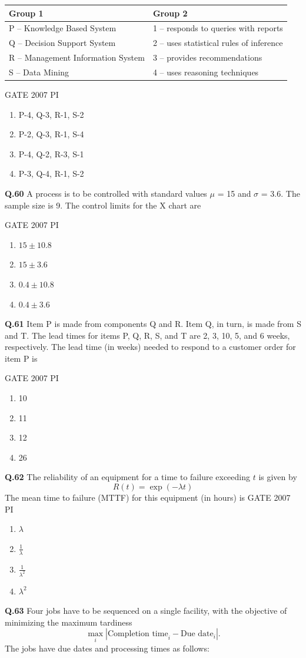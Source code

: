 \documentclass[journal,12pt,onecolumn]{exam}
\theoremstyle{remark}
\begin{document}
\begin{tabular}{|l|l|}
\hline
\textbf{Group 1} & \textbf{Group 2} \\ \hline
P -- Knowledge Based System        & 1 -- responds to queries with reports \\ \hline
Q -- Decision Support System       & 2 -- uses statistical rules of inference \\ \hline
R -- Management Information System & 3 -- provides recommendations \\ \hline
S -- Data Mining                   & 4 -- uses reasoning techniques \\ \hline
\end{tabular}

\hfill{GATE 2007 PI}
\begin{enumerate}
    \item P-4, Q-3, R-1, S-2
    \item P-2, Q-3, R-1, S-4
    \item P-4, Q-2, R-3, S-1
    \item P-3, Q-4, R-1, S-2
\end{enumerate}
\noindent
\textbf{Q.60}
A process is to be controlled with standard values $\mu$
 = 15 and $\sigma$
 = 3.6. The sample size is 9. The control limits for the X chart are
 
 \hfill{GATE 2007 PI}
\begin{enumerate}
    \item $15 \pm 10.8$
    \item $15 \pm 3.6$
    \item $0.4 \pm 10.8$
    \item $0.4 \pm 3.6$
\end{enumerate}
\noindent
\textbf{Q.61}
Item P is made from components Q and R. Item Q, in turn, is made from S and T. The lead times for items P, Q, R, S, and T are 2, 3, 10, 5, and 6 weeks, respectively. The lead time (in weeks) needed to respond to a customer order for item P is

\hfill{GATE 2007 PI}
\begin{enumerate}
    \item 10
    \item 11
    \item 12
    \item 26
\end{enumerate}
\noindent
\textbf{Q.62}
The reliability of an equipment for a time to failure exceeding $t$ is given by  
\[
R(t) = \exp(-\lambda t)
\]  
The mean time to failure (MTTF) for this equipment (in hours) is
\hfill{GATE 2007 PI}
\begin{enumerate}
    \item $\lambda$
    \item $\frac{1}{\lambda}$
    \item $\frac{1}{\lambda^2}$
    \item $\lambda^2$
\end{enumerate}
\noindent
\textbf{Q.63}
Four jobs have to be sequenced on a single facility, with the objective of minimizing 
the maximum tardiness 
\[
\max_i \left| \text{Completion time}_i - \text{Due date}_i \right|.
\]
The jobs have due dates and processing times as follows:
\end{document}
